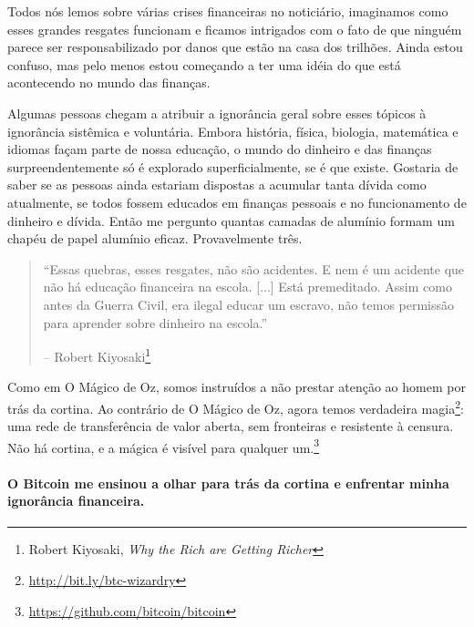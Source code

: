 Todos nós lemos sobre várias crises financeiras no noticiário, 
imaginamos como esses grandes resgates funcionam e ficamos intrigados 
com o fato de que ninguém parece ser responsabilizado por danos que estão na 
casa dos trilhões. Ainda estou confuso, mas pelo menos estou começando a ter 
uma idéia do que está acontecendo no mundo das finanças.

Algumas pessoas chegam a atribuir a ignorância geral sobre esses tópicos à 
ignorância sistêmica e voluntária. Embora história, física, biologia, matemática
e idiomas façam parte de nossa educação, o mundo do dinheiro e das finanças 
surpreendentemente só é explorado superficialmente, se é que existe. Gostaria
de saber se as pessoas ainda estariam dispostas a acumular tanta dívida como 
atualmente, se todos fossem educados em finanças pessoais e no funcionamento 
de dinheiro e dívida. Então me pergunto quantas  camadas de alumínio formam 
um chapéu de papel alumínio eficaz. Provavelmente três.

\begin{quotation}\begin{samepage}
\enquote{Essas quebras, esses resgates, não são acidentes. E nem é um
acidente que não há educação financeira na escola. [...] Está
premeditado. Assim como antes da Guerra Civil, era ilegal educar um escravo,
não temos permissão para aprender sobre dinheiro na escola.}
\begin{flushright} -- Robert Kiyosaki\footnote{Robert Kiyosaki, \textit{Why the Rich
are Getting Richer}\cite{robert-kiyosaki}}
\end{flushright}\end{samepage}\end{quotation}

Como em O Mágico de Oz, somos instruídos a não prestar atenção ao homem por trás da
cortina. Ao contrário de O Mágico de Oz, agora temos verdadeira
magia\footnote{\url{http://bit.ly/btc-wizardry}}: uma rede de transferência de 
valor aberta, sem fronteiras e resistente à censura. Não há cortina, e a mágica 
é visível para qualquer um.\footnote{\url{https://github.com/bitcoin/bitcoin}}

\paragraph{O Bitcoin me ensinou a olhar para trás da cortina e enfrentar minha ignorância financeira.}

%
%
%
%

